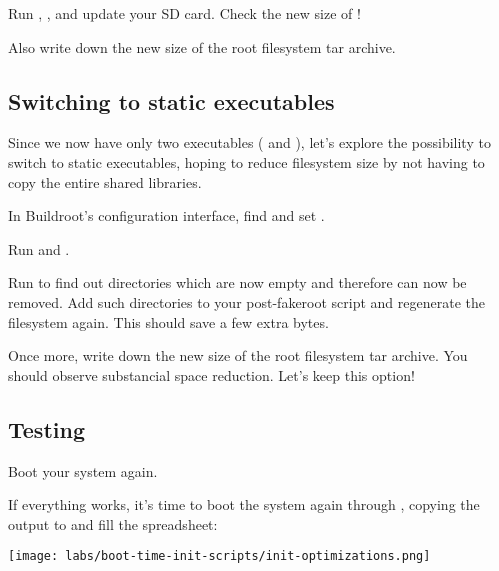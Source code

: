 Run , , and update your SD card.
Check the new size of !

Also write down the new size of the root filesystem tar archive.

\subsection{Switching to static executables}

Since we now have only two executables ( and
), let's explore the possibility to switch to static
executables, hoping to reduce filesystem size by not having to copy
the entire shared libraries.

In Buildroot's configuration interface, find and set
.

Run  and .

Run  to find out directories
which are now empty and therefore can now be removed. Add such directories to
your post-fakeroot script and regenerate the filesystem again.
This should save a few extra bytes.

Once more, write down the new size of the root filesystem tar archive.
You should observe substancial space reduction. Let's keep this option!

\subsection{Testing}
Boot your system again.

If everything works, it's time to boot the system again through
, copying the output to 
and fill the  spreadsheet:

\texttt{[image: labs/boot-time-init-scripts/init-optimizations.png]}
